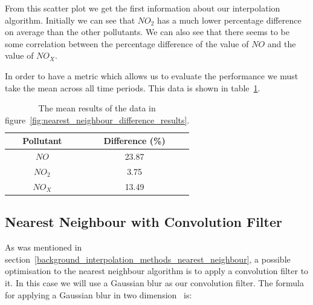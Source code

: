 
			From this scatter plot we get the first information about our interpolation algorithm. Initially we can see that $NO_{2}$ has a much lower percentage difference on average than the other pollutants. We can also see that there seems to be some correlation between the percentage difference of the value of $NO$ and the value of $NO_{X}$. 

			In order to have a metric which allows us to evaluate the performance we must take the mean across all time periods.  This data is shown in table~\ref{tab:nearest_neighbour_difference_results_mean}. 

			\begin{table}[H]
				\centering
	    		\begin{tabular}{|c|c|}
	    			\hline
			        Pollutant & Difference (\%) \\ \hline
					$NO$ & 23.87 \\
					$NO_{2}$ & 3.75 \\
					$NO_{X}$ & 13.49 \\ \hline
				\end{tabular}
				\caption{The mean results of the data in figure~\ref{fig:nearest_neighbour_difference_results}.}
				\label{tab:nearest_neighbour_difference_results_mean}
			\end{table}

		\subsection{Nearest Neighbour with Convolution Filter}\label{prediction_evaluation_results_nearest_neighbour_convolution_filter}


			As was mentioned in section~\ref{background_interpolation_methods_nearest_neighbour}, a possible optimisation to the nearest neighbour algorithm is to apply a convolution filter to it. In this case we will use a Gaussian blur as our convolution filter. The formula for applying a Gaussian blur in two dimension~\cite{gaussianblur} is:

